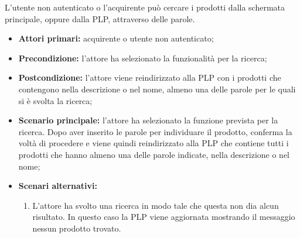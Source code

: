 
\label{ricerca-prodotti-acquirente}

L'utente non autenticato o l'acquirente può cercare i prodotti dalla schermata principale, oppure dalla PLP, attraverso delle parole.
\begin{itemize}
    \item \textbf{Attori primari:} acquirente o utente non autenticato;
    \item \textbf{Precondizione:} l'attore ha selezionato la funzionalità per la ricerca;
    \item \textbf{Postcondizione:} l'attore viene reindirizzato alla PLP con i prodotti che contengono nella descrizione o nel nome, almeno una delle parole per le quali si è svolta la ricerca;
    \item \textbf{Scenario principale:} l'attore ha selezionato la funzione prevista per la ricerca. Dopo aver inserito le parole per individuare il prodotto, conferma la voltà di procedere e viene quindi reindirizzato alla PLP che contiene tutti i prodotti che hanno almeno una delle parole indicate, nella descrizione o nel nome;
    \item \textbf{Scenari alternativi:}
    \begin{enumerate}[label=\lett]
        \item L'attore ha svolto una ricerca in modo tale che questa non dia alcun risultato. In questo caso la PLP viene aggiornata mostrando il messaggio nessun prodotto trovato.
    \end{enumerate}
\end{itemize}


\label{filtro-prodotti-acquirente}

